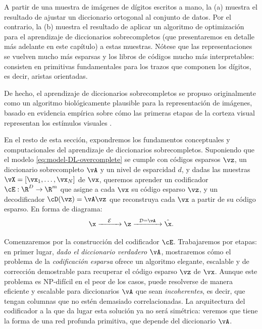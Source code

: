 \documentclass[../../book-main.tex]{subfiles}
\begin{document}
\begin{example}
    A partir de una muestra de imágenes de dígitos escritos a mano,
    la (a) muestra el resultado de ajustar un
    diccionario ortogonal al conjunto de datos.
    Por el contrario, la (b) muestra el resultado de aplicar un 
    algoritmo de optimización para el aprendizaje de diccionarios sobrecompletos (que
    presentaremos en detalle más adelante en este capítulo) a estas muestras.
    Nótese que las representaciones se vuelven mucho más esparsas y los
    libros de códigos mucho más interpretables: consisten en primitivas fundamentales
    para los trazos que componen los dígitos, es decir, aristas orientadas.
\end{example}

De hecho, el aprendizaje de diccionarios sobrecompletos se propuso originalmente como
un algoritmo biológicamente plausible para la representación de imágenes, basado en
evidencia empírica sobre cómo las primeras etapas de la corteza visual representan
los estímulos visuales \cite{Olshausen1996-ap,Olshausen1997-yv}.

En el resto de esta sección, expondremos los fundamentos conceptuales y
computacionales del aprendizaje de diccionarios sobrecompletos.
Suponiendo que el modelo \eqref{eq:model-DL-overcomplete} se cumple con
códigos esparsos \(\vz\), un diccionario sobrecompleto \(\vA\) y un nivel de esparcidad \(d\),
y dadas las muestras \(\vX = [\vx_1, \dots, \vx_N]\) de \(\vx\), queremos aprender
un codificador \(\cE : \R^D \to \R^m\) que asigne a cada \(\vx\) su {código esparso}
\(\vz\), y un decodificador \(\cD(\vz) = \vA \vz\) que reconstruya cada \(\vx\) a partir de
su código esparso. %
En forma de diagrama:
\begin{equation}
    \x \xrightarrow{\hspace{4mm} \mathcal{E} \hspace{4mm}}  \z
    \xrightarrow{\hspace{2mm} \mathcal{D} = \vA \hspace{2mm}}   \hat{\x}.
    \label{eqn:autoencoding-DL-overcomplete}
\end{equation}

Comenzaremos por la construcción del codificador $\cE$.
Trabajaremos por etapas: en primer lugar, \textit{dado el diccionario verdadero
$\vA$}, mostraremos cómo el problema de la \textit{codificación esparsa} ofrece
un algoritmo elegante, escalable y de corrección demostrable para recuperar
el código esparso $\vz$ de $\vx$.
Aunque este problema es NP-difícil en el peor de los casos, puede resolverse
de manera eficiente y escalable para diccionarios $\vA$ que sean
\textit{incoherentes}, es decir, que tengan columnas que no estén demasiado correlacionadas.
La arquitectura del codificador a la que da lugar esta solución ya no
será simétrica: veremos que tiene la forma de una red profunda
primitiva, que depende del diccionario $\vA$.
\end{document}
